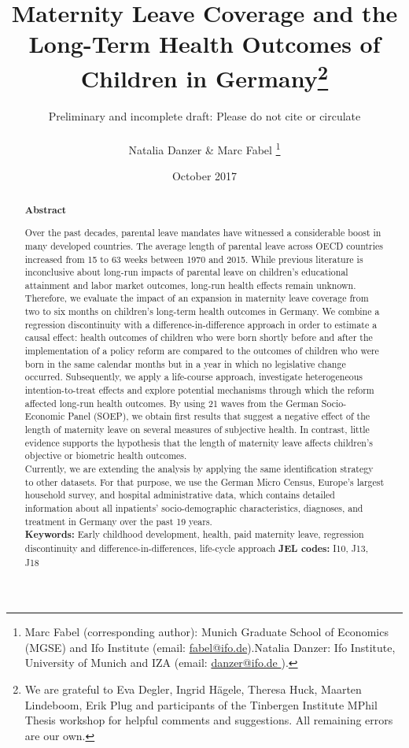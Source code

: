 \documentclass[a4paper ]{article}
\title{Maternity Leave Coverage and the Long-Term Health Outcomes of Children in Germany\footnote{We are grateful to Eva Degler, Ingrid H\"agele, Theresa Huck, Maarten Lindeboom, Erik Plug and participants of the Tinbergen Institute MPhil Thesis workshop for helpful comments and suggestions. All remaining errors are our own.}
}
\author{{\color{red}Preliminary and incomplete draft: Please do not cite or circulate}\\ \\
Natalia Danzer \& Marc Fabel \thanks{Marc Fabel (corresponding author): Munich Graduate School of Economics (MGSE) and Ifo Institute (email: \href{mailto:fabel@ifo.de}{fabel@ifo.de}).\newline Natalia Danzer: Ifo Institute, University of Munich and IZA (email: \href{mailto:danzer@ifo.de }{danzer@ifo.de }).}}
\date{October 2017}
\renewcommand{\headrulewidth}{0.5pt}
\begin{document}
\thispagestyle{empty}\fancyhf{}
\rhead{}
\renewcommand{\headrulewidth}{0.5pt}



%

\newpage

\clearpage
\setcounter{page}{1}    
\rhead{\thepage}

        \newpage

\renewcommand{\abstractname}{\vspace{-\baselineskip}}	%
\maketitle
    \begin{abstract}\noindent 
   \footnotesize{\begin{center}\textbf{Abstract}\end{center} Over the past decades, parental leave mandates have witnessed a considerable boost in many developed countries. The average length of parental leave across OECD countries increased from 15 to 63 weeks between 1970 and 2015. While previous literature is inconclusive about long-run impacts of parental leave on children's educational attainment and labor market outcomes, long-run health effects remain unknown. Therefore, we evaluate the impact of an expansion in maternity leave coverage from two to six months on children's long-term health outcomes in Germany. We combine a regression discontinuity with a difference-in-difference approach in order to estimate a causal effect: health outcomes of children who were born shortly before and after the implementation of a policy reform are compared to the outcomes of children who were born in the same calendar months but in a year in which no legislative change occurred. Subsequently, we apply a life-course approach, investigate heterogeneous intention-to-treat effects and explore potential mechanisms through which the reform affected long-run health outcomes. By using 21 waves from the German Socio-Economic Panel (SOEP), we obtain first results that suggest a negative effect of the length of maternity leave on several measures of subjective health. In contrast, little evidence supports the hypothesis that the length of maternity leave affects children's objective or biometric health outcomes.\newline\\ {\color{red}Currently, we are extending the analysis by applying the same identification strategy to other datasets. For that purpose, we use the German Micro Census, Europe's largest household survey, and hospital administrative data, which contains detailed information about all inpatients' socio-demographic characteristics, diagnoses, and treatment in Germany over the past 19 years.}%
   \\\newline \textbf{Keywords:} Early childhood development, health, paid maternity leave, regression discontinuity and difference-in-differences, life-cycle approach \newline \textbf{JEL codes:} I10, J13, J18}
    \end{abstract}
    
\end{document}
